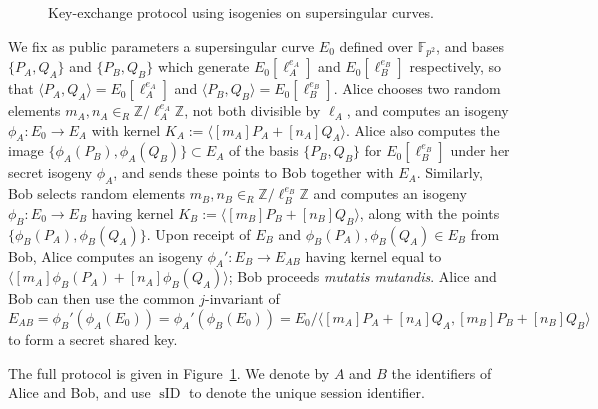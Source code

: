 \documentclass[jmc]{degruyter-journal-a}
\theoremstyle{definition}
\newcommand{\ZZ}{{\mathbb{Z}}}
\newcommand{\FF}{{\mathbb{F}}}
\newcommand{\id}{\operatorname{sID}}
\newcommand{\cyc}[1]{{\langle #1 \rangle}}
\begin{document}
\begin{figure}[t]
\begin{center}
\end{center}
\caption{Key-exchange protocol using isogenies on supersingular
  curves.}
\label{fig:kep}
\end{figure}

We fix as public parameters a supersingular curve $E_0$ defined over
$\FF_{p^2}$, and bases $\{P_{A},Q_{A}\}$ and $\{P_{B},Q_{B}\}$ which
generate $E_0[\ell_A^{e_A}]$ and $E_0[\ell_B^{e_B}]$ respectively, so
that $\cyc{P_{A}, Q_{A}} = E_0[\ell_A^{e_A}]$ and $\cyc{P_{B}, Q_{B}}
= E_0[\ell_B^{e_B}]$.  Alice chooses two random elements $m_A,n_A
\in_R \ZZ/\ell_A^{e_A}\ZZ$, not both divisible by $\ell_A$, and computes
an isogeny $\phi_A\colon E_0 \to E_A$ with kernel $K_A :=
\cyc{[m_A]P_A+[n_A]Q_A}$. Alice also computes the image
$\{\phi_A(P_B), \phi_A(Q_B)\} \subset E_A$ of the basis
$\{P_{B},Q_{B}\}$ for $E_0[\ell_B^{e_B}]$ under her secret isogeny
$\phi_A$, and sends these points to Bob together with
$E_A$. Similarly, Bob selects random elements $m_B,n_B \in_R
\ZZ/\ell_B^{e_B}\ZZ$ and computes an isogeny $\phi_B\colon E_0 \to E_B$
having kernel $K_B := \cyc{[m_B]P_B+[n_B]Q_B}$, along with the points
$\{\phi_B(P_A), \phi_B(Q_A)\}$. Upon receipt of $E_B$
and $\phi_B(P_A),\phi_B(Q_A) \in E_B$ from Bob, Alice computes an
isogeny $\phi_A' \colon E_B \to E_{AB}$ having kernel equal to
$\cyc{[m_A]\phi_B(P_A)+[n_A]\phi_B(Q_A)}$; Bob proceeds \emph{mutatis
mutandis}.  Alice and Bob can then use the common $j$-invariant of
\[ E_{AB} = \phi_B'(\phi_A(E_0))=  \phi_A'(\phi_B(E_0)) =
E_0/\scriptstyle{\cyc{[m_A]P_A+[n_A]Q_A ,[m_B]P_B+[n_B]Q_B }} \]
to form a secret shared key.

The full protocol is given in Figure~\ref{fig:kep}. We denote by $A$
and $B$ the identifiers of Alice and Bob, and use $\id$ to denote the
unique session identifier.
\end{document}

